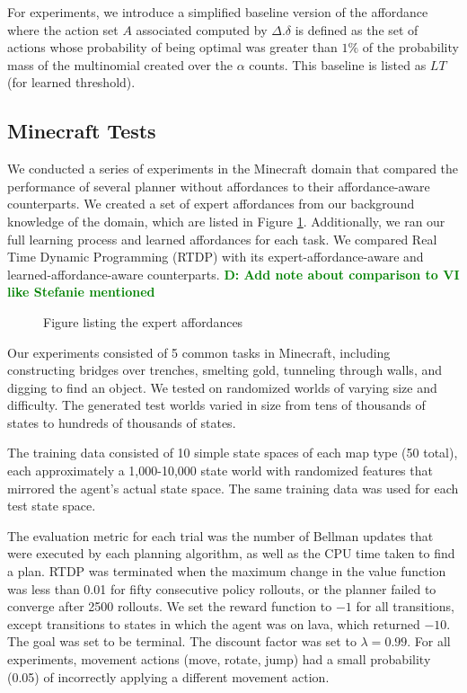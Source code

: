 \documentclass[conference]{IEEEtran}
\newcommand{\dnote}[1]{\textcolor{Green}{\textbf{D: #1}}}
\begin{document}
For experiments, we introduce a simplified baseline version of the affordance where
the action set $A$ associated computed by $\Delta.\delta$ is defined
as the set of actions whose probability of being optimal was greater than $1\%$
of the probability mass of the multinomial created over the $\alpha$ counts. This
baseline is listed as $LT$ (for learned threshold).

\subsection{Minecraft Tests}
We conducted a series of experiments in the Minecraft domain that
compared the performance of several planner without affordances
to their affordance-aware counterparts. We created a set of expert
affordances from our background knowledge of the domain, which are
listed in Figure \ref{fig:afford_kb_exp}. Additionally, we ran our full
learning process and learned affordances for each task. We compared
Real Time Dynamic Programming (RTDP) with its expert-affordance-aware
and learned-affordance-aware counterparts. \dnote{Add note about
comparison to VI like Stefanie mentioned}

\begin{figure}
Figure listing the expert affordances
\label{fig:afford_kb_exp}
\end{figure}

Our experiments consisted of 5 common tasks in Minecraft, including
constructing bridges over trenches, smelting gold, tunneling
through walls, and digging to find an object.  We tested on 
randomized worlds of varying size and difficulty. The generated test
worlds varied in size from tens of thousands of states to hundreds of thousands of states.

The training data consisted of 10 simple state spaces of each map type
(50 total), each approximately a 1,000-10,000 state world with randomized
features that mirrored the agent's actual state space. The same training data
was used for each test state space.

The evaluation metric for each trial was the
number of Bellman updates that were executed by each planning
algorithm, as well as the CPU time taken to find a plan. RTDP was terminated
when the maximum change in the value function was less than 0.01 for fifty 
consecutive policy rollouts, or the planner failed to converge after 2500 rollouts. 
We set the reward  function to $-1$ for all transitions, except transitions to states in 
which the agent was on lava, which returned $-10$. The goal was set to be 
terminal. The discount factor was set to $\lambda = 0.99$. For all experiments,
movement actions (move, rotate, jump) had a small probability (0.05) of 
incorrectly applying a different movement action.
\end{document}
